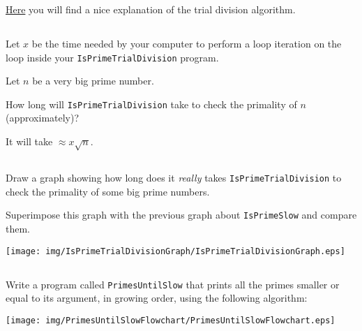 \documentclass[a4paper, 12pt]{article}
\begin{document}
\href{https://www.khanacademy.org/computing/computer-science/cryptography/comp-number-theory/a/trial-divisionalgorithm}{Here}
you will find a nice explanation of the trial division algorithm.


\subsection{}

Let $x$ be the time needed by your computer to perform a loop iteration on the
loop inside your \texttt{IsPrimeTrialDivision} program.

Let $n$ be a very big prime number.

How long will \texttt{IsPrimeTrialDivision} take to check the primality of $n$
(approximately)?

\begin{solution}
It will take $\approx x\sqrt{n}$.
\end{solution}

\subsection{}

Draw a graph showing how long does it \emph{really} takes
\texttt{IsPrimeTrialDivision} to check the primality of some big prime numbers.

Superimpose this graph with the previous graph about \texttt{IsPrimeSlow} and
compare them.

\begin{solution}
  \centering
  \texttt{[image: img/IsPrimeTrialDivisionGraph/IsPrimeTrialDivisionGraph.eps]}
\end{solution}

\subsection{}

Write a program called \texttt{PrimesUntilSlow} that prints all the primes
smaller or equal to its argument, in growing order, using the following
algorithm:

\begin{center}
  \texttt{[image: img/PrimesUntilSlowFlowchart/PrimesUntilSlowFlowchart.eps]}
\end{center}
\vspace{0.5cm}

\end{document}
